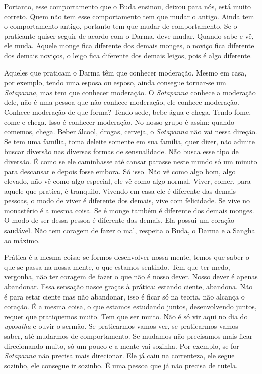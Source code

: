 Portanto, esse comportamento que o Buda ensinou, deixou para nós,
está muito correto. Quem não tem esse comportamento tem que mudar o
antigo. Ainda tem o comportamento antigo, portanto tem que mudar de
comportamento. Se o praticante quiser seguir de acordo com o Darma,
deve mudar. Quando sabe e vê, ele muda. Aquele monge fica diferente dos
demais monges, o noviço fica diferente dos demais noviços, o leigo fica
diferente dos demais leigos, pois é algo diferente. 

Aqueles que praticam o Darma têm que conhecer moderação. Mesmo em
casa, por exemplo, tendo uma esposa ou esposo, ainda consegue tornar-se
um \textit{Sotāpanna}, mas tem que conhecer moderação. O
\textit{Sotāpanna} conhece a moderação dele, não é uma pessoa que não
conhece moderação, ele conhece moderação. Conhece moderação de que
forma? Tendo sede, bebe água e chega. Tendo fome, come e chega. Isso é
conhecer moderação. No nosso grupo é assim: quando comemos, chega.
Beber álcool, drogas, cerveja, o \textit{Sotāpanna} não vai nessa
direção. Se tem uma família, toma deleite somente em sua família, quer
dizer, não admite buscar diversão nas diversas formas de sensualidade.
Não busca esse tipo de diversão. É como se ele caminhasse até cansar
parasse neste mundo só um minuto para descansar e depois fosse embora.
Só isso. Não vê como algo bom, algo elevado, não vê como algo especial,
ele vê como algo normal. Viver, comer, para aquele que pratica, é
tranquilo. Vivendo em casa ele é diferente das demais pessoas, o modo
de viver é diferente dos demais, vive com felicidade. Se vive no
monastério é a mesma coisa. Se é monge também é diferente dos demais
monges. O modo de ser dessa pessoa é diferente das demais. Ela possui
um coração saudável. Não tem coragem de fazer o mal, respeita o Buda, o
Darma e a Sangha ao máximo. 

Prática é a mesma coisa: se formos desenvolver nossa mente, temos
que saber o que se passa na nossa mente, o que estamos sentindo. Tem
que ter medo, vergonha, não ter coragem de fazer o que não é nosso
dever. Nosso dever é apenas abandonar. Essa sensação nasce graças à
prática: estando ciente, abandona. Não é para estar ciente mas não
abandonar, isso é ficar só na teoria, não alcança o coração. É a mesma
coisa, o que estamos estudando juntos, desenvolvendo juntos, requer que
pratiquemos muito. Tem que ser muito. Não é só vir aqui no dia do
\textit{uposatha} e ouvir o sermão. Se praticarmos vamos ver, se
praticarmos vamos saber, até mudarmos de comportamento. Se mudamos não
precisamos mais ficar direcionando muito, só um pouco e a mente vai
sozinha. Por exemplo, se for \textit{Sotāpanna} não precisa mais
direcionar. Ele já caiu na correnteza, ele segue sozinho, ele consegue
ir sozinho. É uma pessoa que já não precisa de tutela. 

